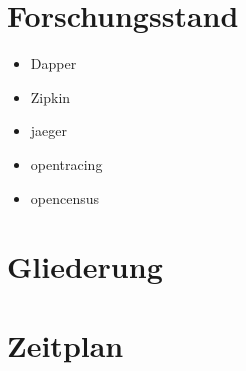 \documentclass[a4paper]{article}
\begin{document}
\section{Forschungsstand}
	\begin{itemize}
		\item Dapper
		\item Zipkin
		\item jaeger
		\item opentracing
		\item opencensus
	\end{itemize}
\section{Gliederung}
\section{Zeitplan}
\end{document}
